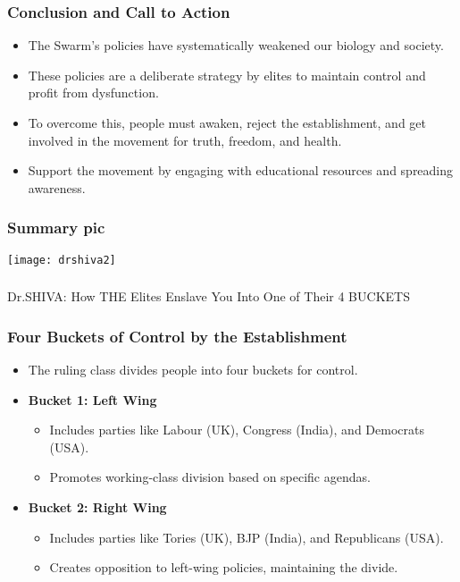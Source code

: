 \begin{frame}[fragile]\frametitle{Conclusion and Call to Action}
      \begin{itemize}
          \item The Swarm’s policies have systematically weakened our biology and society.
          \item These policies are a deliberate strategy by elites to maintain control and profit from dysfunction.
          \item To overcome this, people must awaken, reject the establishment, and get involved in the movement for truth, freedom, and health.
          \item Support the movement by engaging with educational resources and spreading awareness.
      \end{itemize}
\end{frame}


\begin{frame}[fragile]\frametitle{Summary pic}

\begin{center}
\texttt{[image: drshiva2]}
\end{center}	  
\end{frame}


\begin{frame}[fragile]\frametitle{}
\begin{center}
{\Large Dr.SHIVA: How THE Elites Enslave You Into One of Their 4 BUCKETS}
\end{center}
\end{frame}


\begin{frame}[fragile]\frametitle{Four Buckets of Control by the Establishment}
      \begin{itemize}
        \item The ruling class divides people into four buckets for control.
        \item \textbf{Bucket 1: Left Wing} 
        \begin{itemize}
            \item Includes parties like Labour (UK), Congress (India), and Democrats (USA).
            \item Promotes working-class division based on specific agendas.
        \end{itemize}
        \item \textbf{Bucket 2: Right Wing} 
        \begin{itemize}
            \item Includes parties like Tories (UK), BJP (India), and Republicans (USA).
            \item Creates opposition to left-wing policies, maintaining the divide.
        \end{itemize}
      \end{itemize}
\end{frame}

